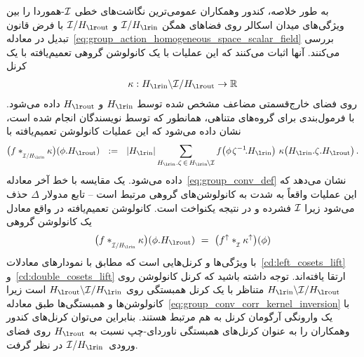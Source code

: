 به طور خلاصه، کندور وهمکاران\cite{Kondor2018-GENERAL} عمومی‌ترین نگاشت‌های خطی $\mathcal{I}$-هموردا را بین ویژگی‌های میدان اسکالر روی فضاهای همگن $\I/\Hin$ و $\I/\Hout$ با فرض قانون تبدیل در معادله~\eqref{eq:group_action_homogeneous_space_scalar_field} بررسی می‌کنند.
آنها اثبات می‌کنند که این عملیات با یک کانولوشن گروهی تعمیم‌یافته با یک کرنل
\begin{align}
	\kappa: \Hin\backslash \I/\Hout \to \R
\end{align}
روی فضای خارج‌قسمتی مضاعف مشخص شده توسط $\Hin$ و $\Hout$ داده می‌شود.
با فرمول‌بندی برای گروه‌های متناهی، همانطور که توسط نویسندگان انجام شده است، نشان داده می‌شود که این عملیات کانولوشن تعمیم‌یافته با
\begin{align}\label{eq:quotient_space_conv_Kondor}
	\big(f \ast_{\overset{}{\scalebox{.64}{$\I/\Hin$}}} \kappa \big) (\phi.\Hout)
	\ \ :=\ \ |\Hin| \sum_{\Hin.\zeta \,\in\, \Hin\mkern-2.5mu\backslash\mkern-.5mu\I}
	f\big( \phi\mkern2mu \zeta^{-1}\!. \Hin\big)\ \kappa\big( \Hin.\zeta.\Hout \big) \,.
\end{align}
داده می‌شود. یک مقایسه با خط آخر معادله~\eqref{eq:group_conv_def} نشان می‌دهد که این عملیات واقعاً به شدت به کانولوشن‌های گروهی مرتبط است -- تابع مدولار $\Delta$ حذف می‌شود زیرا $\mathcal{I}$ فشرده و در نتیجه یکنواخت است.
کانولوشن تعمیم‌یافته در واقع معادل یک کانولوشن گروهی
\begin{align}
	\big(f \ast_{\overset{}{\scalebox{.64}{$\I/\Hin$}}} \kappa \big) (\phi.\Hout)
	\ =\ \big(f^\uparrow \ast_{\overset{}{\protect\scalebox{.64}{$\mkern-.5mu \I$}}} \kappa^\uparrow \big)(\phi)
\end{align}
با ویژگی‌ها و کرنل‌هایی است که مطابق با نمودارهای معادلات~\eqref{cd:left_cosets_lift} و~\eqref{cd:double_cosets_lift} ارتقا یافته‌اند.
توجه داشته باشید که کرنل کانولوشن روی $\Hin\backslash \I/\Hout$ متناظر با یک کرنل همبستگی روی $\Hout\backslash \I/\Hin$ است زیرا کانولوشن‌ها و همبستگی‌ها طبق معادله~\eqref{eq:group_conv_corr_kernel_inversion} با یک وارونگی آرگومان کرنل به هم مرتبط هستند.
بنابراین می‌توان کرنل‌های کندور وهمکاران\cite{Kondor2018-GENERAL} را به عنوان کرنل‌های همبستگی ناوردای-چپ نسبت به $\Hout$ روی فضای ورودی~$\I/\Hin$ در نظر گرفت.


